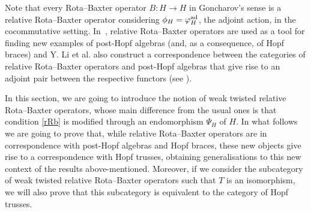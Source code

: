 \documentclass[10pt,a4paper]{amsart}
\numberwithin{equation}{section}
\begin{document}
Note that every Rota--Baxter operator $B\colon H\rightarrow H$ in Goncharov's sense is a relative Rota--Baxter operator considering $\phi_{H}=\varphi_{H}^{{\rm ad}}$, the adjoint action, in the cocommutative setting. In~\cite{LST}, relative Rota--Baxter operators are used as a tool for finding new examples of post-Hopf algebras (and, as a consequence, of Hopf braces) and Y. Li et al. also construct a correspondence between the categories of relative Rota--Baxter operators and post-Hopf algebras that give rise to an adjoint pair between the respective functors (see \cite[Theorem 3.3]{LST}).

In this section, we are going to introduce the notion of weak twisted relative Rota--Baxter operators, whose main difference from the usual ones is that condition \eqref{rRb} is modified through an endomorphism $\Psi_{H}$ of $H$. In what follows we are going to prove that, while relative Rota--Baxter operators are in correspondence with post-Hopf algebras and Hopf braces, these new objects give rise to a correspondence with Hopf trusses, obtaining generalisations to this new context of the results above-mentioned. Moreover, if we consider the subcategory of weak twisted relative Rota--Baxter operators such that $T$ is an isomorphism, we will also prove that this subcategory is equivalent to the category of Hopf trusses.
\end{document}
